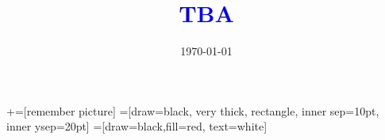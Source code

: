 \documentclass[notes, 12.5pt, aspectratio=169]{beamer}
\title[]{\textcolor{blue}{TBA}}
\author[PGP]{}
\institute[ifo]{\small{\begin{tabular}{c c}
\large Florian Schoner   \\
\large ifo  \\
\end{tabular}}}
\date{\today}
\begin{document}
\newcommand\marktopleft[1]{%
    \tikz[overlay,remember picture] 
        \node (marker-#1-a) at (-.3em,.3em) {};%
}
\newcommand\markbottomright[2]{%
    \tikz[overlay,remember picture] 
        \node (marker-#1-b) at (0em,0em) {};%
}
+=[remember picture] 
 =[draw=black, very thick, rectangle, inner sep=10pt, inner ysep=20pt]
 =[draw=black,fill=red, text=white]

\begin{frame}
\maketitle
\end{frame}
\end{document}
